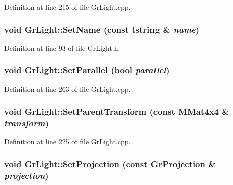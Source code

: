 Definition at line 215 of file GrLight.cpp.\hypertarget{class_gr_light_4b9e87a1336fecc7d8311cd69c64e74d}{
\subsubsection[{SetName}]{\setlength{\rightskip}{0pt plus 5cm}void GrLight::SetName (const {\bf tstring} \& {\em name})}}
\label{class_gr_light_4b9e87a1336fecc7d8311cd69c64e74d}




Definition at line 93 of file GrLight.h.\hypertarget{class_gr_light_a6bd83e0258a25bea793cdc6aa65d175}{
\subsubsection[{SetParallel}]{\setlength{\rightskip}{0pt plus 5cm}void GrLight::SetParallel (bool {\em parallel})}}
\label{class_gr_light_a6bd83e0258a25bea793cdc6aa65d175}




Definition at line 263 of file GrLight.cpp.\hypertarget{class_gr_light_47b4cf3ca3413ce90fa7ce5318a05943}{
\subsubsection[{SetParentTransform}]{\setlength{\rightskip}{0pt plus 5cm}void GrLight::SetParentTransform (const {\bf MMat4x4} \& {\em transform})}}
\label{class_gr_light_47b4cf3ca3413ce90fa7ce5318a05943}




Definition at line 225 of file GrLight.cpp.\hypertarget{class_gr_light_0be864006e4aa859494a5813e435c2e7}{
\subsubsection[{SetProjection}]{\setlength{\rightskip}{0pt plus 5cm}void GrLight::SetProjection (const {\bf GrProjection} \& {\em projection})}}
\label{class_gr_light_0be864006e4aa859494a5813e435c2e7}




